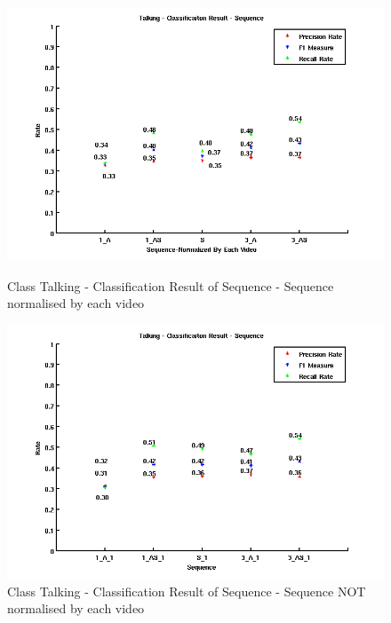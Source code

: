 \begin{figure}[ht]
\centering
\begin{minipage}{.5\textwidth}
  \centering
  \captionsetup{justification=centering,margin=1cm}
  \includegraphics[width=\linewidth]{imgs/Result_Talking_Sequence.png}
  \caption{Class Talking - Classification Result of Sequence - Sequence normalised by each video}
  \label{fig:RTS}
\end{minipage}%
\begin{minipage}{.5\textwidth}
  \centering
  \captionsetup{justification=centering,margin=1cm}
  \includegraphics[width=\linewidth]{imgs/Result_Talking_Sequence_1.png}
  \caption{Class Talking - Classification Result of Sequence - Sequence NOT normalised by each video}
  \label{fig:RTS1}
\end{minipage}
\end{figure}
\newline
